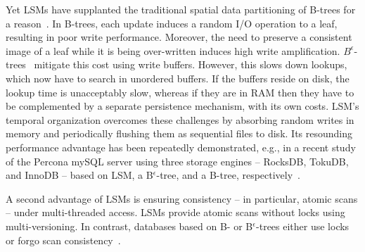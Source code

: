 Yet  LSMs have supplanted the  traditional spatial data partitioning of B-trees for a reason~\cite{rocks-vs-inno}.
In  B-trees, each update induces a random I/O operation to a leaf, resulting in poor write performance.
Moreover, the need to preserve a consistent image of a leaf while it is being over-written induces high write amplification. 
$B^{\epsilon}$-trees~\cite{Brodal:2003:LBE:644108.644201} mitigate this cost using write buffers. %
However, this slows down lookups, which now have to search in %
unordered buffers. 
If the buffers reside on disk, the lookup time is unacceptably slow, whereas
if they are in RAM then they have to be complemented by a separate persistence mechanism, with its own costs.  
LSM's temporal organization overcomes these challenges by absorbing random writes in memory and periodically flushing them as 
sequential files to disk. 
Its resounding performance advantage has been repeatedly demonstrated, 
e.g., in a recent  study of the Percona mySQL server using three storage engines -- RocksDB, TokuDB, and InnoDB --
based on LSM, a B$^{\epsilon}$-tree, and a B-tree, respectively~\cite{toku-rocks-inno}.




 
A second advantage of LSMs is ensuring consistency -- in particular, atomic scans --   under multi-threaded access. 
LSMs provide atomic scans without locks using multi-versioning. 
In contrast, databases based on B- or  B$^\epsilon$-trees either use locks \inred{[citations]} or forgo scan consistency~\cite{tucana}.


